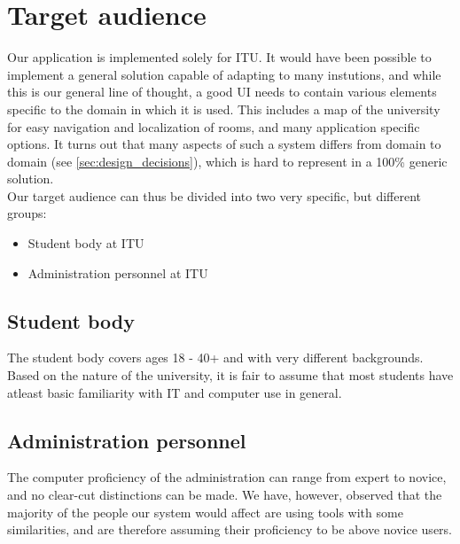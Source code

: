 \section{Target audience} %
\label{sec:target_audience}
Our application is implemented solely for ITU. It would have been possible to implement a general solution capable of adapting to many instutions, and while this is our general line of thought, a good UI needs to contain various elements specific to the domain in which it is used. This includes a map of the university for easy navigation and localization of rooms, and many application specific options. It turns out that many aspects of such a system differs from domain to domain (see \ref{sec:design_decisions}), which is hard to represent in a 100\% generic solution.\\

Our target audience can thus be divided into two very specific, but different groups:
\begin{itemize}
\item Student body at ITU
\item Administration personnel at ITU
\end{itemize}

\subsection*{Student body}
The student body covers ages 18 - 40+ and with very different backgrounds. Based on the nature of the university, it is fair to assume that most students have atleast basic familiarity with IT and computer use in general.

\subsection*{Administration personnel}
The computer proficiency of the administration can range from expert to novice, and no clear-cut distinctions can be made. We have, however, observed that the majority of the people our system would affect are using tools with some similarities, and are therefore assuming their proficiency to be above novice users.
